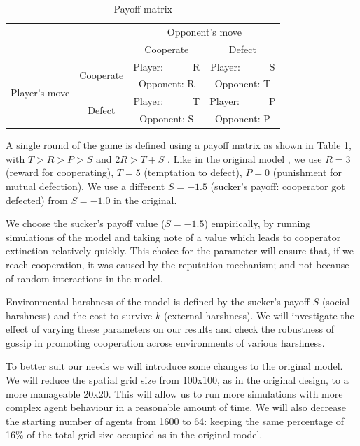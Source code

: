 \documentclass[english]{article}
\begin{document}
\begin{table}[h!]
  \centering
  \begin{tabular}{c c||c|c}
    & & \multicolumn{2}{c}{Opponent's move} \\
    & & Cooperate & Defect \\
    \hline\hline

    \multirow{4}{6em}{Player's move}
    & \multirow{2}{5em}{Cooperate}
      & Player:\ \ \ \ \ \ R & Player:\ \ \ \ \ \ S \\
    & & Opponent: R & Opponent: T \\
    \cline{2-4}
    & \multirow{2}{5em}{Defect}
      & Player:\ \ \ \ \ \ T & Player:\ \ \ \ \ \ P \\
    & & Opponent: S & Opponent: P \\
  \end{tabular}

  \caption{Payoff matrix}
  \label{table:payoff}
\end{table}

A single round of the game is defined using a payoff matrix as shown in Table \ref{table:payoff}, with $T > R > P > S$ and $2R > T + S$ \citep{chammah1965}.
Like in the original model \citep{smaldino},
we use $R = 3$ (reward for cooperating),
$T = 5$ (temptation to defect),
$P = 0$ (punishment for mutual defection).
We use a different $S = -1.5$ (sucker's payoff: cooperator got defected) from $S = -1.0$ in the original.

We choose the sucker's payoff value ($S = -1.5$) empirically,
by running simulations of the model and taking note of a value which leads to cooperator extinction relatively quickly.
This choice for the parameter will ensure that, if we reach cooperation, it was caused by the reputation mechanism;
and not because of random interactions in the model.

Environmental harshness of the model is defined by
the sucker's payoff $S$ (social harshness) and
the cost to survive $k$ (external harshness).
We will investigate the effect of varying these parameters on our results
and check the robustness of gossip in promoting cooperation across environments of various harshness.

To better suit our needs we will introduce some changes to the original model.
We will reduce the spatial grid size from 100x100, as in the original design, to a more manageable 20x20.
This will allow us to run more simulations with more complex agent behaviour in a reasonable amount of time.
We will also decrease the starting number of agents from 1600 to 64: keeping the same percentage of 16\% of the total grid size occupied as in the original model.
\end{document}
